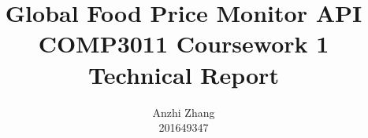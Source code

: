 \documentclass[12pt,a4paper,twocolumn,titlepage]{article}
\title{%
    Global Food Price Monitor API\\%
    \large COMP3011 Coursework 1 Technical Report%
}
\author{%
    Anzhi Zhang\\%
    201649347%
}
\date{}
\begin{document}
\maketitle



\printbibliography

\appendix
\onecolumn

\end{document}

